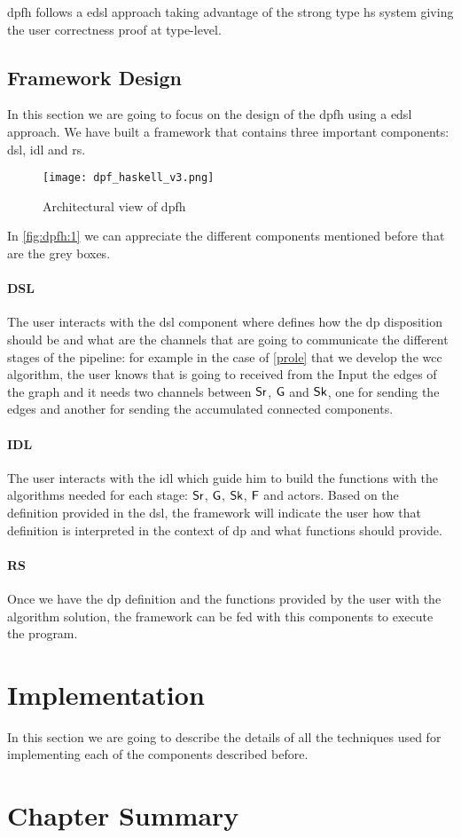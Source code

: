 \acrshort{dpfh} follows a \acrshort{edsl} approach taking advantage of the strong type \acrshort{hs} system giving the user correctness proof at type-level.

\subsection{Framework Design}
In this section we are going to focus on the design of the \acrshort{dpfh} using a \acrshort{edsl} approach. We have built a framework that contains
three important components: \acrshort{dsl}, \acrshort{idl} and \acrshort{rs}. 

\begin{figure}[!ht]
  \centering
  \begin{minipage}{\textwidth}
   \texttt{[image: dpf\_haskell\_v3.png]}
    \caption{Architectural view of \acrshort{dpfh}}
    \label{fig:dpfh:1}
  \end{minipage}
\end{figure}

In \autoref{fig:dpfh:1} we can appreciate the different components mentioned before that are the grey boxes.

\paragraph{DSL} The user interacts with the \acrshort{dsl} component where defines how the \acrshort{dp} disposition
should be and what are the channels that are going to communicate the different stages of the pipeline: for example in the
case of \autoref{prole} that we develop the \acrshort{wcc} algorithm, the user knows that is going to received from the Input 
the edges of the graph and it needs two channels between $\mathsf{Sr}$, $\mathsf{G}$ and $\mathsf{Sk}$, one for sending the edges and another for sending
the accumulated connected components. 

\paragraph{IDL} The user interacts with the \acrshort{idl} which guide him to build the functions with the algorithms needed for each stage: 
$\mathsf{Sr}$, $\mathsf{G}$, $\mathsf{Sk}$, $\mathsf{F}$ and actors. Based on the definition provided in the \acrshort{dsl}, the framework will indicate the user 
how that definition is interpreted in the context of \acrshort{dp} and what functions should provide.

\paragraph{RS} Once we have the \acrshort{dp} definition and the functions provided by the user with the algorithm solution, the framework
can be fed with this components to execute the program. 

\section{Implementation}
In this section we are going to describe the details of all the techniques used for implementing each of the components described before.


\section{Chapter Summary}

